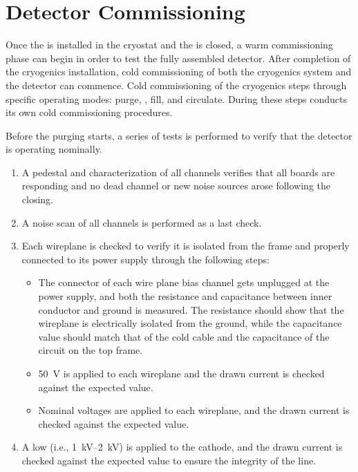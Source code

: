 \section{Detector Commissioning}
\label{sec:fdsp-tc-commiss}


Once the  is installed in the cryostat and the  is closed, a warm commissioning phase can begin in order to test the fully assembled detector.  After completion of the cryogenics installation, cold commissioning of both the cryogenics system and the detector can commence. Cold commissioning of the cryogenics steps through specific operating modes: purge, \cooldown, fill, and circulate. During these steps  conducts its own cold commissioning procedures. 
 

Before the purging starts, a series of tests is performed to verify that the detector is operating nominally. 

\begin{enumerate}

    \item A pedestal and  characterization of all  channels verifies that all   boards are responding and no dead channel or new noise sources arose following the  closing.
    
    \item A noise scan of all  channels is performed as a last check. %

    \item Each  wireplane is checked to verify it is isolated from the  frame and properly connected to its  power supply through the following steps:
    
\begin{itemize}

    \item The  connector of each wire plane bias channel gets unplugged at the power supply, and both the resistance and capacitance between inner conductor and ground is measured. 
    The resistance should show that the wireplane is electrically isolated from the ground, while the capacitance value should match that of the cold  cable and the capacitance of the circuit on the  top frame.

    \item \SI{50}{V} is applied to each wireplane and the drawn current is checked against the expected value.
    
    \item Nominal voltages are applied to each wireplane, and the  drawn current is checked against the expected value. 
    
\end{itemize}

    \item A low  (i.e., \SIrange{1}{2}{kV}) is applied to the cathode, and the drawn current is checked against the expected value to ensure the integrity of the  line.

\end{enumerate}

